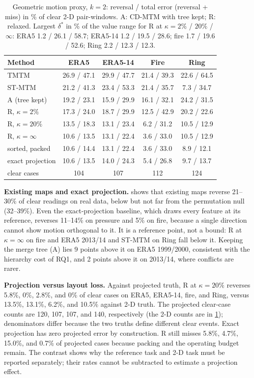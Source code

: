 \documentclass[review]{vgtc}                 %
\begin{document}
\begin{table}[t]
\centering\small
\setlength{\tabcolsep}{2.6pt}
\begin{tabular}{lcccc}\toprule
Method & ERA5 & ERA5-14 & Fire & Ring\\\midrule
TMTM & 26.9 / 47.1 & 29.9 / 47.7 & 21.4 / 39.3 & 22.6 / 64.5\\
ST-MTM & 21.2 / 41.3 & 23.4 / 53.3 & 21.4 / 35.7 & \phantom{0}7.3 / 34.7\\
A (tree kept) & 19.2 / 23.1 & 15.9 / 29.9 & 16.1 / 32.1 & 24.2 / 31.5\\\midrule
R, $\kappa=2\%$ & 17.3 / 24.0 & 18.7 / 29.9 & 12.5 / 42.9 & 20.2 / 22.6\\
R, $\kappa=20\%$ & 13.5 / 18.3 & 13.1 / 23.4 & \phantom{0}6.2 / 31.2 & 10.5 / 12.9\\
R, $\kappa=\infty$ & 10.6 / 13.5 & 13.1 / 22.4 & \phantom{0}3.6 / 33.0 & 10.5 / 12.9\\\midrule
sorted, packed & 10.6 / 14.4 & 13.1 / 22.4 & \phantom{0}3.6 / 33.0 & \phantom{0}8.9 / 12.1\\
exact projection & 10.6 / 13.5 & 14.0 / 24.3 & \phantom{0}5.4 / 26.8 & \phantom{0}9.7 / 13.7\\
clear cases & 104 & 107 & 112 & 124\\\bottomrule
\end{tabular}
\caption{Geometric motion proxy, $k=2$: reversal / total error (reversal + miss) in \% of clear 2-D pair-windows. A: CD-MTM with tree kept; R: relaxed. Largest $\delta^*$ in \% of the value range for R at $\kappa=2\%$ / $20\%$ / $\infty$: ERA5 1.2 / 26.1 / 58.7; ERA5-14 1.2 / 19.5 / 28.6; fire 1.7 / 19.6 / 52.6; Ring 2.2 / 12.3 / 12.3.}
\label{tab:proxy}
\end{table}

\textbf{Existing maps and exact projection.}  shows that existing maps reverse 21--30\% of clear readings on real data, below but not far from the permutation null (32--39\%). Even the exact-projection baseline, which draws every feature at its reference, reverses 11--14\% on pressure and 5\% on fire, because a single direction cannot show motion orthogonal to it. It is a reference point, not a bound: R at $\kappa=\infty$ on fire and ERA5 2013/14 and ST-MTM on Ring fall below it. Keeping the merge tree (A) lies 9 points above it on ERA5 1999/2000, consistent with the hierarchy cost of RQ1, and 2 points above it on 2013/14, where conflicts are rarer.

\textbf{Projection versus layout loss.} Against projected truth, R at $\kappa=20\%$ reverses 5.8\%, 0\%, 2.8\%, and 0\% of clear cases on ERA5, ERA5-14, fire, and Ring, versus 13.5\%, 13.1\%, 6.2\%, and 10.5\% against 2-D truth. The projected clear-case counts are 120, 107, 107, and 140, respectively (the 2-D counts are in \cref{tab:proxy}); denominators differ because the two truths define different clear events. Exact projection has zero projected error by construction. R still misses 5.8\%, 4.7\%, 15.0\%, and 0.7\% of projected cases because packing and the operating budget remain. The contrast shows why the reference task and 2-D task must be reported separately; their rates cannot be subtracted to estimate a projection effect.
\end{document}
